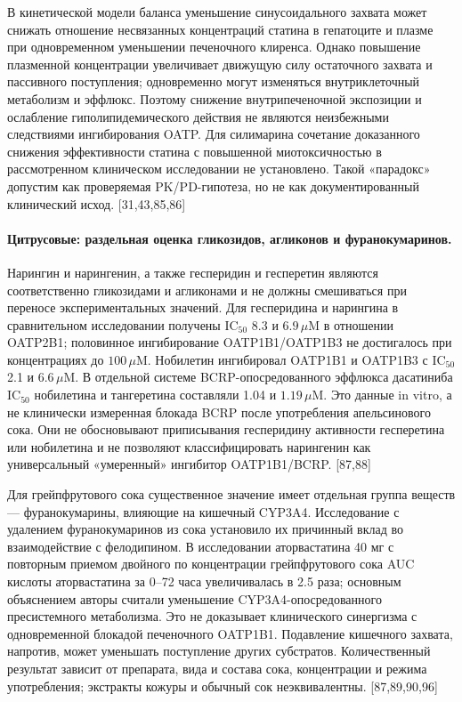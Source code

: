 \documentclass[11pt]{article}
\begin{document}
В кинетической модели баланса уменьшение синусоидального захвата может снижать отношение несвязанных концентраций статина в гепатоците и плазме при одновременном уменьшении печеночного клиренса. Однако повышение плазменной концентрации увеличивает движущую силу остаточного захвата и пассивного поступления; одновременно могут изменяться внутриклеточный метаболизм и эффлюкс. Поэтому снижение внутрипеченочной экспозиции и ослабление гиполипидемического действия не являются неизбежными следствиями ингибирования OATP. Для силимарина сочетание доказанного снижения эффективности статина с повышенной миотоксичностью в рассмотренном клиническом исследовании не установлено. Такой «парадокс» допустим как проверяемая PK/PD-гипотеза, но не как документированный клинический исход. [31,43,85,86]

\paragraph{Цитрусовые: раздельная оценка гликозидов, агликонов и фуранокумаринов.}
Нарингин и нарингенин, а также гесперидин и гесперетин являются соответственно гликозидами и агликонами и не должны смешиваться при переносе экспериментальных значений. Для гесперидина и нарингина в сравнительном исследовании получены \(\mathrm{IC}_{50}\) 8.3 и \(6.9\,\mu\mathrm{M}\) в отношении OATP2B1; половинное ингибирование OATP1B1/OATP1B3 не достигалось при концентрациях до \(100\,\mu\mathrm{M}\). Нобилетин ингибировал OATP1B1 и OATP1B3 с \(\mathrm{IC}_{50}\) 2.1 и \(6.6\,\mu\mathrm{M}\). В отдельной системе BCRP-опосредованного эффлюкса дасатиниба \(\mathrm{IC}_{50}\) нобилетина и тангеретина составляли 1.04 и \(1.19\,\mu\mathrm{M}\). Это данные in vitro, а не клинически измеренная блокада BCRP после употребления апельсинового сока. Они не обосновывают приписывания гесперидину активности гесперетина или нобилетина и не позволяют классифицировать нарингенин как универсальный «умеренный» ингибитор OATP1B1/BCRP. [87,88]

Для грейпфрутового сока существенное значение имеет отдельная группа веществ --- фуранокумарины, влияющие на кишечный CYP3A4. Исследование с удалением фуранокумаринов из сока установило их причинный вклад во взаимодействие с фелодипином. В исследовании аторвастатина 40 мг с повторным приемом двойного по концентрации грейпфрутового сока AUC кислоты аторвастатина за 0--72 часа увеличивалась в 2.5 раза; основным объяснением авторы считали уменьшение CYP3A4-опосредованного пресистемного метаболизма. Это не доказывает клинического синергизма с одновременной блокадой печеночного OATP1B1. Подавление кишечного захвата, напротив, может уменьшать поступление других субстратов. Количественный результат зависит от препарата, вида и состава сока, концентрации и режима употребления; экстракты кожуры и обычный сок неэквивалентны. [87,89,90,96]
\end{document}
